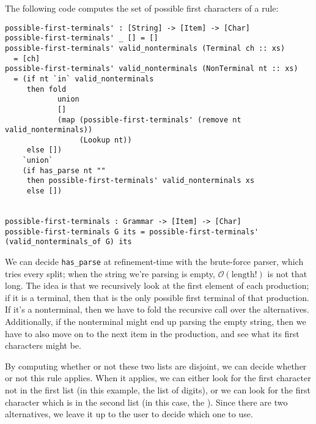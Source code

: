   The following code computes the set of possible first characters of a rule:
\begin{verbatim}
possible-first-terminals' : [String] -> [Item] -> [Char]
possible-first-terminals' _ [] = []
possible-first-terminals' valid_nonterminals (Terminal ch :: xs)
  = [ch]
possible-first-terminals' valid_nonterminals (NonTerminal nt :: xs)
  = (if nt `in` valid_nonterminals
     then fold
            union
            []
            (map (possible-first-terminals' (remove nt valid_nonterminals))
                 (Lookup nt))
     else [])
    `union`
    (if has_parse nt ""
     then possible-first-terminals' valid_nonterminals xs
     else [])
     

possible-first-terminals : Grammar -> [Item] -> [Char]
possible-first-terminals G its = possible-first-terminals' (valid_nonterminals_of G) its
\end{verbatim}
   We can decide \verb|has_parse| at refinement-time with the brute-force parser, which tries every split; when the string we're parsing is empty, $\mathcal O(\text{length}!)$ is not that long.  The idea is that we recursively look at the first element of each production; if it is a terminal, then that is the only possible first terminal of that production.  If it's a nonterminal, then we have to fold the recursive call over the alternatives.  Additionally, if the nonterminal might end up parsing the empty string, then we have to also move on to the next item in the production, and see what its first characters might be.
   
   By computing whether or not these two lists are disjoint, we can decide whether or not this rule applies.  When it applies, we can either look for the first character not in the first list (in this example, the list of digits), or we can look for the first character which is in the second list (in this case, the \terminal{+}).  Since there are two alternatives, we leave it up to the user to decide which one to use.
   

